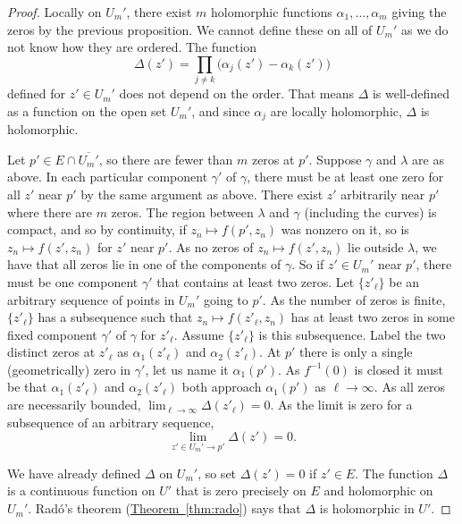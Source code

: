 \documentclass[12pt,openany]{book}
\theoremstyle{plain}
\theoremstyle{remark}
\theoremstyle{definition}
\theoremstyle{exercise}
\theoremstyle{example}
\newcommand{\thmref}[1]{\hyperref[#1]{Theorem~\ref*{#1}}}
\begin{document}
\begin{proof}
Locally on $U_m'$, there exist $m$ holomorphic functions
$\alpha_1, \ldots, \alpha_m$ giving the zeros by the previous proposition.
We cannot define these on all of $U_m'$ as we do not know how they are
ordered.
The function
\begin{equation*}
\Delta(z') = \prod_{j \not= k} \bigl( \alpha_j(z') - \alpha_k(z') \bigr) 
\end{equation*}
defined for $z' \in U_m'$ does not depend on the order.
That means $\Delta$ is well-defined as a function on the open set $U_m'$,
and since $\alpha_j$ are locally holomorphic, $\Delta$ is holomorphic.

Let $p' \in E \cap \overline{U_m'}$,
so there are fewer than $m$ zeros at $p'$.
Suppose $\gamma$ and $\lambda$ are as above.
In each particular component $\gamma'$ of $\gamma$, there must
be at least one zero for all $z'$ near $p'$ by the same argument as above.
There exist $z'$ arbitrarily near $p'$ where there are $m$ zeros.
The region between $\lambda$ and $\gamma$ (including the curves) is compact,
and so by continuity,
if $z_n \mapsto f(p',z_n)$ was nonzero on it,
so is $z_n \mapsto f(z',z_n)$ for $z'$ near $p'$.
As no zeros of $z_n \mapsto f(z',z_n)$ lie outside $\lambda$,
we have that all
zeros lie in one of the components of $\gamma$.  So if $z' \in U_m'$ near
$p'$, there must be one
component $\gamma'$ that contains at least two zeros.  Let $\{ z'_\ell \}$
be an arbitrary sequence of points in $U_m'$ going to $p'$.
As the number of zeros is finite, $\{ z'_\ell \}$ has a
subsequence such that $z_n \mapsto f(z'_\ell,z_n)$ has at least two zeros in
some fixed component $\gamma'$ of $\gamma$ for $z'_\ell$.  Assume $\{ z'_\ell
\}$ is this subsequence.  Label the two distinct zeros at $z'_\ell$
as $\alpha_1(z'_\ell)$ and
$\alpha_2(z'_\ell)$.  At $p'$ there is only a single (geometrically) zero in $\gamma'$, let
us name it $\alpha_1(p')$.  As $f^{-1}(0)$ is closed it must be that
$\alpha_1(z'_\ell)$ and $\alpha_2(z'_\ell)$ both approach $\alpha_1(p')$ as
$\ell \to \infty$.
As all zeros are necessarily bounded,
$\lim_{\ell \to \infty} \Delta(z'_\ell) = 0$.  As the limit is zero for a 
subsequence of an arbitrary sequence,
\begin{equation*}
\lim_{z' \in U_m' \to p'} \Delta(z') = 0 .
\end{equation*}

We have already defined $\Delta$ on $U_m'$, so set $\Delta(z') = 0$ if $z' \in E$.
The function $\Delta$ is a continuous function on $U'$ that is zero precisely on
$E$ and holomorphic on $U_m'$.
Rad{\'o}'s theorem
(\thmref{thm:rado}) says that $\Delta$ is holomorphic in $U'$.
\end{proof}
\end{document}
